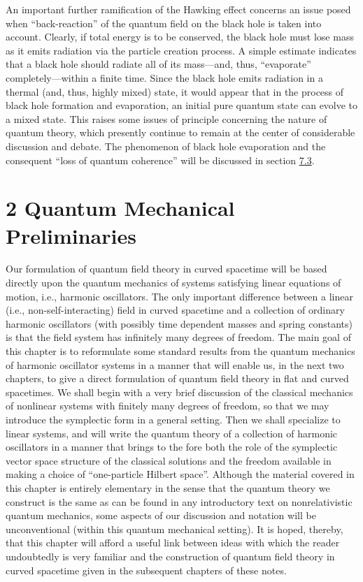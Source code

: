 \documentclass[11pt,a4paper]{article}
\begin{document}
An important further ramification of the Hawking effect concerns an issue posed when ``back-reaction'' of the quantum field on the black hole is taken into account. Clearly, if total energy is to be conserved, the black hole must lose mass as it emits radiation via the particle creation process. A simple estimate indicates that a black hole should radiate all of its mass---and, thus, ``evaporate'' completely---within a finite time. Since the black hole emits radiation in a thermal (and, thus, highly mixed) state, it would appear that in the process of black hole formation and evaporation, an initial pure quantum state can evolve to a mixed state. This raises some issues of principle concerning the nature of quantum theory, which presently continue to remain at the center of considerable discussion and debate. The phenomenon of black hole evaporation and the consequent ``loss of quantum coherence'' will be discussed in section \hyperlink{sec:7.3}{7.3}.

\clearpage
\hypertarget{source-23}{}
\section*{2 Quantum Mechanical Preliminaries}\hypertarget{sec:2}{}

Our formulation of quantum field theory in curved spacetime will be based directly upon the quantum mechanics of systems satisfying linear equations of motion, i.e., harmonic oscillators. The only important difference between a linear (i.e., non-self-interacting) field in curved spacetime and a collection of ordinary harmonic oscillators (with possibly time dependent masses and spring constants) is that the field system has infinitely many degrees of freedom. The main goal of this chapter is to reformulate some standard results from the quantum mechanics of harmonic oscillator systems in a manner that will enable us, in the next two chapters, to give a direct formulation of quantum field theory in flat and curved spacetimes. We shall begin with a very brief discussion of the classical mechanics of nonlinear systems with finitely many degrees of freedom, so that we may introduce the symplectic form in a general setting. Then we shall specialize to linear systems, and will write the quantum theory of a collection of harmonic oscillators in a manner that brings to the fore both the role of the symplectic vector space structure of the classical solutions and the freedom available in making a choice of ``one-particle Hilbert space''. Although the material covered in this chapter is entirely elementary in the sense that the quantum theory we construct is the same as can be found in any introductory text on nonrelativistic quantum mechanics, some aspects of our discussion and notation will be unconventional (within this quantum mechanical setting). It is hoped, thereby, that this chapter will afford a useful link between ideas with which the reader undoubtedly is very familiar and the construction of quantum field theory in curved spacetime given in the subsequent chapters of these notes.
\end{document}
